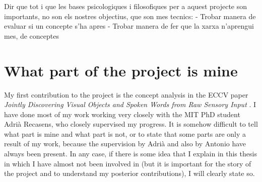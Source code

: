 Dir que tot i que les bases psicologiques i filosofiques per a aquest
projecte son importants, no son els nostres objectius, que son mes
tecnics: - Trobar manera de evaluar si un concepte s’ha apres - Trobar
manera de fer que la xarxa n’aprengui mes, de conceptes

\section{What part of the project is mine}
\label{section:my_part}
My first contribution to the project is the concept analysis in the ECCV paper \emph{Jointly Discovering Visual Objects and Spoken Words from Raw Sensory Input} \cite{Harwath_2018_ECCV}.
I have done most of my work working very closely with the MIT PhD student Adrià Recasens, who closely supervised my progress. It is somehow difficult to tell what part is mine and what part is not, or to state that some parts are only a result of my work, because the supervision by Adrià and also by Antonio have always been present. In any case, if there is some idea that I explain in this thesis in which I have almost not been involved in (but it is important for the story of the project and to understand my posterior contributions), I will clearly state so.







